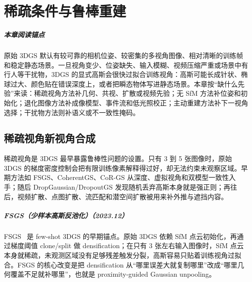 \chapter{稀疏条件与鲁棒重建}

\paragraph*{本章阅读锚点}
原始 3DGS 默认有较可靠的相机位姿、较密集的多视角图像、相对清晰的训练帧和稳定静态场景。一旦视角变少、位姿缺失、输入模糊、视频压缩严重或场景中有行人等干扰物，3DGS 的显式高斯会很快过拟合训练视角：高斯可能长成针状、椭球过大、颜色贴在错误深度上，或者把瞬态物体写进静态场景。本章按“缺什么先验”来读：稀疏视角方法补几何、共视、扩散或视频先验；无 SfM 方法补位姿和初始化；退化图像方法补成像模型、事件流和低光照校正；主动重建方法补下一视角选择；干扰物方法则补语义或不一致性掩码。

\section{稀疏视角新视角合成}

稀疏视角是 3DGS 最早暴露鲁棒性问题的设置。只有 3 到 5 张图像时，原始 3DGS 的梯度密度控制会把有限训练像素解释得过好，却无法约束未观察区域。早期方法如 FSGS、CoherentGS、CoR-GS 从深度、虚拟视角和双模型一致性入手；随后 DropGaussian/DropoutGS 发现随机丢弃高斯本身就是强正则；再往后，视频扩散、点图扩散、流匹配和潜空间扩散被用来补外推与遮挡内容。



\paragraph{FSGS（少样本高斯反池化）（2023.12）}
FSGS~\cite{2312_00451} 是 few-shot 3DGS 的早期锚点。原始 3DGS 依赖 SfM 点云初始化，再通过梯度阈值 clone/split 做 densification；在只有 3 张左右输入图像时，SfM 点云本身就稀疏，未观测区域没有足够残差触发分裂，高斯容易只贴着训练视角过拟合。FSGS 的核心改变是把 densification 从“哪里误差大就复制哪里”改成“哪里几何覆盖不足就补哪里”，也就是 proximity-guided Gaussian unpooling。

